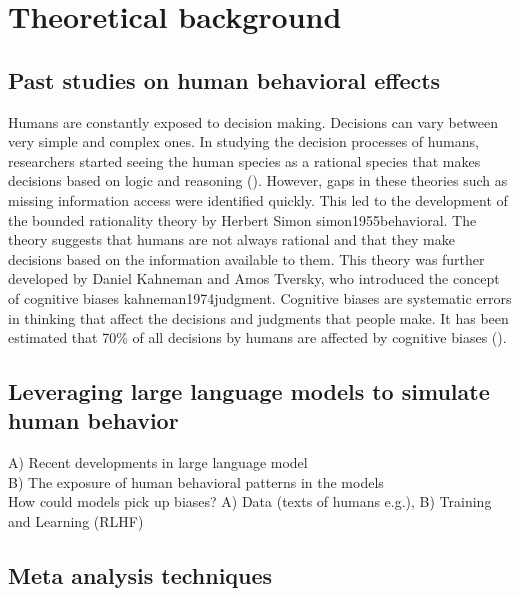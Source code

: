 \section{Theoretical background}

\subsection{Past studies on human behavioral effects}
Humans are constantly exposed to decision making. Decisions can vary between very simple and complex ones. In studying the decision processes of humans, researchers started seeing the human species as a rational species that makes decisions based on logic and reasoning (\cite{juarez2018analyzing}). However, gaps in these theories such as missing information access were identified quickly. This led to the development of the bounded rationality theory by Herbert Simon {simon1955behavioral}. The theory suggests that humans are not always rational and that they make decisions based on the information available to them. This theory was further developed by Daniel Kahneman and Amos Tversky, who introduced the concept of cognitive biases {kahneman1974judgment}. Cognitive biases are systematic errors in thinking that affect the decisions and judgments that people make.
It has been estimated that 70\% of all decisions by humans are affected by cognitive biases (\cite{juarez2018analyzing}).

\subsection{Leveraging large language models to simulate human behavior}
A) Recent developments in large language model\\
B) The exposure of human behavioral patterns in the models\\
How could models pick up biases? A) Data (texts of humans e.g.), B) Training and Learning (RLHF)

\subsection{Meta analysis techniques}